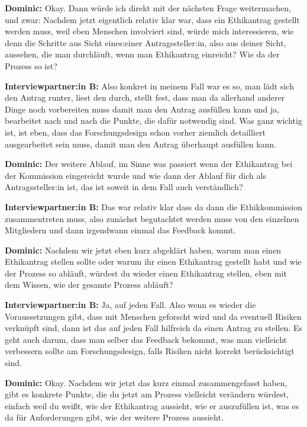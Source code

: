 \documentclass[a4paper,12pt,twoside]{scrreprt}
\begin{document}
\textbf{Dominic:} Okay. Dann würde ich direkt mit der nächsten Frage weitermachen, und zwar: Nachdem jetzt eigentlich relativ klar war, dass ein Ethikantrag gestellt werden muss, weil eben Menschen involviert sind, würde mich interessieren, wie denn die Schritte aus Sicht eines:einer Antragssteller:in, also aus deiner Sicht, aussehen, die man durchläuft, wenn man Ethikantrag einreicht? Wie da der Prozess so ist?

\textbf{Interviewpartner:in B:} Also konkret in meinem Fall war es so, man lädt sich den Antrag runter, liest den durch, stellt fest, dass man da allerhand anderer Dinge noch vorbereiten muss damit man den Antrag ausfüllen kann und ja, bearbeitet nach und nach die Punkte, die dafür notwendig sind. Was ganz wichtig ist, ist eben, dass das Forschungsdesign schon vorher ziemlich detailliert ausgearbeitet sein muss, damit man den Antrag überhaupt ausfüllen kann.

\textbf{Dominic:} Der weitere Ablauf, im Sinne was passiert wenn der Ethikantrag bei der Kommission eingereicht wurde und wie dann der Ablauf für dich als Antragssteller:in ist, das ist soweit in dem Fall auch verständlich?

\textbf{Interviewpartner:in B:} Das war relativ klar dass da dann die Ethikkommission zusammentreten muss, also zunächst begutachtet werden muss von den einzelnen Mitgliedern und dann irgendwann einmal das Feedback kommt.

\textbf{Dominic:} Nachdem wir jetzt eben kurz abgeklärt haben, warum man einen Ethikantrag stellen sollte oder warum ihr einen Ethikantrag gestellt habt und wie der Prozess so abläuft, würdest du wieder einen Ethikantrag stellen, eben mit dem Wissen, wie der gesamte Prozess abläuft?

\textbf{Interviewpartner:in B:} Ja, auf jeden Fall. Also wenn es wieder die Voraussetzungen gibt, dass mit Menschen geforscht wird und da eventuell Risiken verknüpft sind, dann ist das auf jeden Fall hilfreich da einen Antrag zu stellen. Es geht auch darum, dass man selber das Feedback bekommt, was man vielleicht verbessern sollte am Forschungsdesign, falls Risiken nicht korrekt berücksichtigt sind.

\textbf{Dominic:} Okay. Nachdem wir jetzt das kurz einmal zusammengefasst haben, gibt es konkrete Punkte, die du jetzt am Prozess vielleicht verändern würdest, einfach weil du weißt, wie der Ethikantrag aussieht, wie er auszufüllen ist, was es da für Anforderungen gibt, wie der weitere Prozess aussieht.
\end{document}
